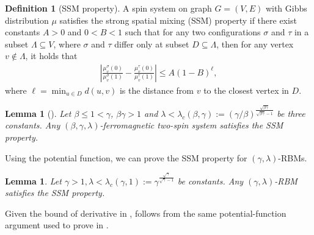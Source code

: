 \documentclass[11pt]{amsart}
\newcommand{\abs}[1]{\ensuremath{\left\vert#1\right\vert}}
\newcommand{\defeq}{:=}
\newtheorem{lemma}[theorem]{Lemma}
\theoremstyle{definition}
\newtheorem{definition}[theorem]{Definition}
\theoremstyle{remark}
\begin{document}
    \begin{definition}[SSM property]\label{def:ssm-property}
        A spin system on graph $G=(V,E)$ with Gibbs distribution $\mu$ satisfies the strong spatial mixing (SSM) property if there exist constants $A > 0$ and $0 < B < 1$ such that for any two configurations $\sigma$ and $\tau$ in a subset $\Lambda \subseteq V$, where $\sigma$ and $\tau$ differ only at subset $D \subseteq \Lambda$, then for any vertex $v \not\in \Lambda$, it holds that 
        \begin{align*}
        \abs{\frac{\mu^\sigma_v(0)}{\mu^\sigma_v(1)} - \frac{\mu^\tau_v(0)}{\mu^\tau_v(1)}} \leq A (1 - B)^\ell,
        \end{align*}
        where $\ell = \min_{u \in D} d(u,v)$ is the distance from $v$ to the closest vertex in $D$.
    \end{definition}

\begin{lemma}[]\label{lemma:ssm-property}
    Let $\beta \leq 1 < \gamma$, $\beta \gamma > 1$ and $\lambda < \lambda_c(\beta,\gamma) \defeq (\gamma/\beta)^{\frac{\sqrt{\beta \gamma}}{\sqrt{\beta \gamma}-1}}$ be three constants.
    Any $(\beta,\gamma,\lambda)$-ferromagnetic two-spin system satisfies the SSM property.
\end{lemma}

Using the potential function, we can prove the SSM property for $(\gamma,\lambda)$-RBMs.
\begin{lemma}\label{lemma:ssm-property-rbm}
    Let $\gamma > 1, \lambda < \lambda_c(\gamma,1) \defeq \gamma^{\frac{\sqrt{\gamma}}{{\sqrt{\gamma}-1}}} $ be constants.
    Any $(\gamma,\lambda)$-RBM satisfies the SSM property.
\end{lemma}

Given the bound of derivative in ,  follows from the same potential-function argument used to prove  in \cite{GuoL18}. %
\end{document}
